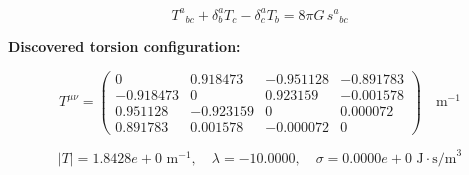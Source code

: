 
\begin{equation}
  T^a{}_{bc} + \delta^a_b T_c - \delta^a_c T_b = 8\pi G \, s^a{}_{bc}
\end{equation}

\textbf{Discovered torsion configuration:}

\begin{equation}
  T^{\mu\nu} = \begin{pmatrix}
    0 & 0.918473 & -0.951128 & -0.891783 \\
    -0.918473 & 0 & 0.923159 & -0.001578 \\
    0.951128 & -0.923159 & 0 & 0.000072 \\
    0.891783 & 0.001578 & -0.000072 & 0
  \end{pmatrix} \quad \text{m}^{-1}
\end{equation}

\begin{equation}
  |T| = 1.8428e+0 \text{ m}^{-1}, \quad
  \lambda = -10.0000, \quad
  \sigma = 0.0000e+0 \text{ J}\cdot\text{s/m}^3
\end{equation}